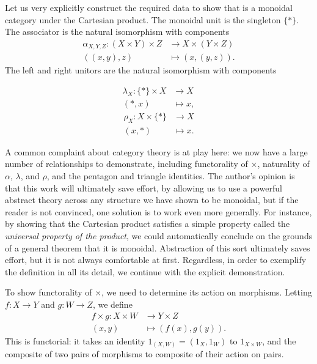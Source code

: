 \begin{ex}\label{ex:set-monoidal}
  Let us very explicitly construct the required data to show that
   is a monoidal category under the Cartesian product. The monoidal unit
  is the singleton $\{*\}$. The associator is the natural isomorphism with
  components \begin{align*}
    \alpha_{X,Y,Z} \colon (X\times Y)\times Z &\to X\times(Y\times Z)\\
    ((x, y), z) &\mapsto (x, (y, z)).
  \end{align*}
  The left and right unitors are the natural isomorphism with components
  \begin{multicols}{2}
    \noindent
    \begin{align*}
      \lambda_X \colon \{*\}\times X &\to X \\
      (*, x) &\mapsto x,
    \end{align*}
    \begin{align*}
      \rho_X \colon X\times\{*\} &\to X \\
      (x, *) &\mapsto x.
    \end{align*}
  \end{multicols}

  A common complaint about category theory is at play here: we now have a
  large number of relationships to demonstrate, including
  functorality of $\times$, naturality of $\alpha$, $\lambda$, and $\rho$, and
  the pentagon and triangle identities. The author's opinion is that this work
  will ultimately save effort, by allowing us to use a powerful abstract theory
  across any structure we have shown to be monoidal, but if the reader is not
  convinced, one solution is to work even more generally. For instance, by
  showing that the Cartesian product satisfies a simple property called the
  \emph{universal property of the product}, we could automatically conclude on
  the grounds of a general theorem that it is monoidal. Abstraction of this sort
  ultimately saves effort, but it is not always comfortable at first.
  Regardless, in order to exemplify the definition in all its detail, we
  continue with the explicit demonstration.

  To show functorality of $\times$, we need to determine its action on
  morphisms. Letting $f: X\to Y$ and $g: W\to Z$, we define \begin{align*}
    f\times g\colon X\times W &\to Y\times Z \\
                       (x, y) &\mapsto (f(x), g(y)).
  \end{align*}
  This is functorial: it takes an identity $1_{(X, W)} = (1_X, 1_W)$ to
  $1_{X\times W}$, and the composite of two pairs of morphisms to composite of
  their action on pairs.


\end{ex}
